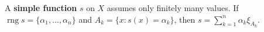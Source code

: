 A \textbf{simple function} $s$ on $X$ assumes only finitely many values. If $\operatorname{rng} s = \{\alpha_1, \ldots, \alpha_n\}$ and $A_k = \{x : s(x) = \alpha_k\}$, then $s = \sum_{k=1}^{n} \alpha_k \xi_{A_k}$.
